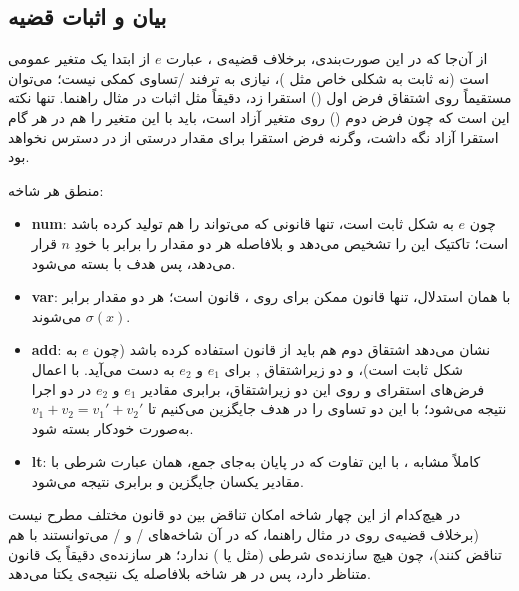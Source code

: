 \documentclass[12pt]{report}
\newcommand{\ltlbox}[1]{%
	\begin{center}
		\color{white}
		\setlength{\fboxsep}{8pt}
		\fcolorbox{white}{CustomBackground}{
			\parbox{0.9\linewidth}{\centering $#1$}
		}
	\end{center}
}
\begin{document}
	\subsection{بیان و اثبات قضیه}
	
	\ltlbox{\langle e,\sigma\rangle \Downarrow v_1 \;\land\; \langle e,\sigma\rangle \Downarrow v_2 \;\Rightarrow\; v_1 = v_2}
	
	از آن‌جا که در این صورت‌بندی، برخلاف قضیه‌ی ، عبارت $e$ از ابتدا یک متغیر عمومی است (نه ثابت به شکلی خاص مثل )، نیازی به ترفند /تساوی کمکی نیست؛ می‌توان مستقیماً روی اشتقاق فرض اول () استقرا زد، دقیقاً مثل اثبات  در مثال راهنما. تنها نکته این است که چون فرض دوم () روی متغیر آزاد  است، باید با  این متغیر را هم در هر گام استقرا آزاد نگه داشت، وگرنه فرض استقرا برای مقدار درستی از  در دسترس نخواهد بود.
	
	منطق هر شاخه:
	\begin{itemize}
		\item \textbf{num}: چون $e$ به شکل  ثابت است، تنها قانونی که می‌تواند  را هم تولید کرده باشد  است؛ تاکتیک  این را تشخیص می‌دهد و بلافاصله هر دو مقدار را برابر با خودِ $n$ قرار می‌دهد، پس هدف با  بسته می‌شود.
		\item \textbf{var}: با همان استدلال، تنها قانون ممکن برای  روی ، قانون  است؛ هر دو مقدار برابر $\sigma(x)$ می‌شوند.
		\item \textbf{add}:  نشان می‌دهد اشتقاق دوم هم باید از قانون  استفاده کرده باشد (چون $e$ به شکل  ثابت است)، و دو زیراشتقاق ,  برای $e_1$ و $e_2$ به دست می‌آید. با اعمال فرض‌های استقرای  و  روی این دو زیراشتقاق، برابری مقادیر $e_1$ و $e_2$ در دو اجرا نتیجه می‌شود؛ با  این دو تساوی را در هدف جایگزین می‌کنیم تا $v_1+v_2 = v_1'+v_2'$ به‌صورت خودکار بسته شود.
		\item \textbf{lt}: کاملاً مشابه ، با این تفاوت که در پایان به‌جای جمع، همان عبارت شرطی  با مقادیر یکسان جایگزین و برابری نتیجه می‌شود.
	\end{itemize}
	
	در هیچ‌کدام از این چهار شاخه امکان تناقض بین دو قانون مختلف مطرح نیست (برخلاف قضیه‌ی  روی  در مثال راهنما، که در آن شاخه‌های / و / می‌توانستند با هم تناقض کنند)، چون  هیچ سازنده‌ی شرطی (مثل  یا ) ندارد؛ هر سازنده‌ی  دقیقاً یک قانون  متناظر دارد، پس  در هر شاخه بلافاصله یک نتیجه‌ی یکتا می‌دهد.
	
\end{document}
